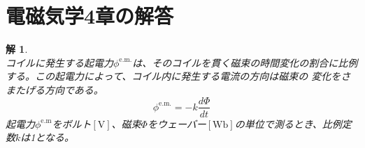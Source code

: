 \documentclass{jsarticle}
\newtheorem{ans}{解}[section]
\begin{document}
\newpage

\setcounter{section}{0}

\section{電磁気学4章の解答}

\begin{ans}~\\
    コイルに発生する起電力\(\phi^{\mathrm{e.m.}}\)は、そのコイルを貫く磁束の時間変化の割合に比例する。この起電力によって、コイル内に発生する電流の方向は磁束の
    変化をさまたげる方向である。
    \begin{equation*}
        \phi^{\mathrm{e.m.}}=-k\frac{d\Phi}{dt}
    \end{equation*}
    起電力\(\phi^{\mathrm{e.m}}\)をボルト\(\mathrm{[V]}\)、磁束\(\Phi\)をウェーバー\(\mathrm{[Wb]}\)の単位で測るとき、比例定数\(k\)は1となる。
\end{ans}
\end{document}
